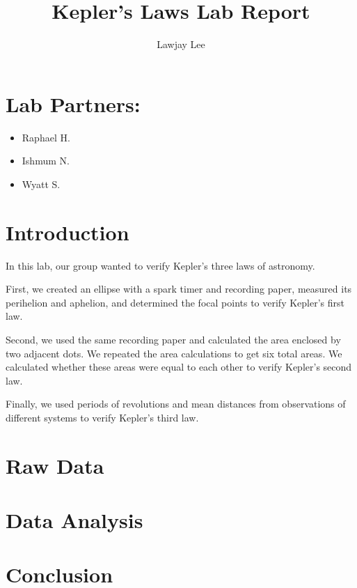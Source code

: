 \documentclass[fleqn]{article}
\title{Kepler's Laws Lab Report}
\author{Lawjay Lee}
\date{}
\begin{document}
\maketitle

\section*{Lab Partners:}
\begin{itemize}
	\item Raphael H.
	\item Ishmum N.
	\item Wyatt S.
\end{itemize}

\section*{Introduction}
In this lab, our group wanted to verify Kepler's three laws of astronomy.

First, we created an ellipse with a spark timer and recording paper, measured its perihelion and aphelion, and determined the focal points to verify Kepler's first law.

Second, we used the same recording paper and calculated the area enclosed by two adjacent dots. We repeated the area calculations to get six total areas. We calculated whether these areas were equal to each other to verify Kepler's second law.

Finally, we used periods of revolutions and mean distances from observations of different systems to verify Kepler's third law.
\section*{Raw Data}

\section*{Data Analysis}

\section*{Conclusion}
\end{document}
